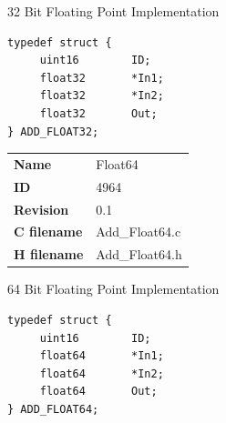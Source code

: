 32 Bit Floating Point Implementation

\begin{lstlisting}
typedef struct {
     uint16        ID;
     float32       *In1;
     float32       *In2;
     float32       Out;
} ADD_FLOAT32;
\end{lstlisting}

\ifdefined \AddTestReports
{}
\fi
{}
\nopagebreak[0]
\begin{tabular}{l l}
\textbf{Name} & Float64 \tabularnewline
\textbf{ID} & 4964 \tabularnewline
\textbf{Revision} & 0.1 \tabularnewline
\textbf{C filename} & Add\_Float64.c \tabularnewline
\textbf{H filename} & Add\_Float64.h \tabularnewline
\end{tabular}
\vspace{1ex}

64 Bit Floating Point Implementation

\begin{lstlisting}
typedef struct {
     uint16        ID;
     float64       *In1;
     float64       *In2;
     float64       Out;
} ADD_FLOAT64;
\end{lstlisting}

\ifdefined \AddTestReports
{}
\fi

